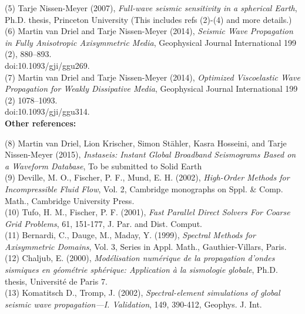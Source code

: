 \documentclass{article}
\begin{document}
(5) Tarje Nissen-Meyer (2007),
\textit{Full-wave seismic sensitivity in a spherical Earth},
Ph.D. thesis, Princeton University
(This includes refs (2)-(4) and more details.)\\

(6) Martin van Driel and Tarje Nissen-Meyer (2014),
\textit{Seismic Wave Propagation in Fully Anisotropic Axisymmetric Media},
Geophysical Journal International 199 (2), 880–893.\\
doi:10.1093/gji/ggu269.\\

(7) Martin van Driel and Tarje Nissen-Meyer (2014),
\textit{Optimized Viscoelastic Wave Propagation for Weakly Dissipative Media},
Geophysical Journal International 199 (2) 1078–1093.\\
doi:10.1093/gji/ggu314.\\

%


\noindent \textbf{Other references:}\vspace*{0.2cm}

(8) Martin van Driel, Lion Krischer, Simon Stähler, Kasra Hosseini, and Tarje Nissen-Meyer (2015),
\textit{Instaseis: Instant Global Broadband Seismograms Based on a Waveform Database},
To be submitted to Solid Earth\\

(9) Deville, M. O., Fischer, P. F., Mund, E. H. (2002),
\textit{High-Order Methods for Incompressible Fluid Flow},
Vol. 2, Cambridge monographs on Sppl. \& Comp. Math., Cambridge University Press.\\

(10) Tufo, H. M., Fischer, P. F. (2001), \textit{Fast Parallel Direct Solvers For Coarse
Grid Problems}, 61, 151-177, J. Par. and Dist. Comput.\\

(11) Bernardi, C., Dauge, M., Maday, Y. (1999), \textit{Spectral Methods for Axisymmetric
Domains}, Vol. 3, Series in Appl. Math., Gauthier-Villars, Paris.\\

(12) Chaljub, E. (2000), \textit{Mod{\'{e}}lisation num{\'{e}}rique de la
propagation d'ondes sismiques en g{\'{e}}om{\'{e}}trie sph{\'{e}}rique:
Application {\`{a}} la sismologie globale},
Ph.D. thesis, Universit{\'{e}} de Paris 7.\\

(13) Komatitsch D., Tromp, J. (2002), \textit{Spectral-element simulations of
global seismic wave propagation---I. Validation},
149, 390-412, Geophys. J. Int.
\end{document}

